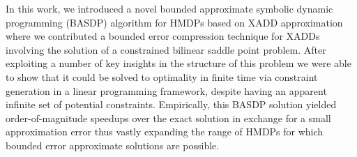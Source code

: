 
In this work, we introduced a novel bounded approximate symbolic
dynamic programming (BASDP) algorithm for HMDPs based on XADD
approximation where we contributed a bounded error compression technique
for XADDs involving the solution of a constrained bilinear saddle
point problem.  After exploiting a number of key insights in the
structure of this problem we were able to show that it could be solved
to optimality in finite time via constraint generation in a linear
programming framework, despite having an apparent infinite set of
potential constraints.  Empirically, this BASDP solution yielded
order-of-magnitude speedups over the exact solution in exchange for a
small approximation error thus vastly expanding the range of HMDPs
for which bounded error approximate solutions are possible.
